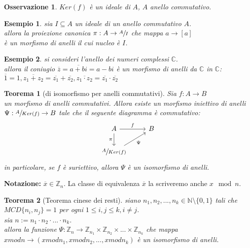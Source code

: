 \documentclass[a4paper,12pt]{article}
\theoremstyle{def}
\theoremstyle{prop}
\theoremstyle{esempio}
\newtheorem*{example}{Esempio}
\theoremstyle{dimostrazione}
\theoremstyle{teo}
\newtheorem*{teorema}{Teorema}
\theoremstyle{osservazione}
\newtheorem*{osservazione}{Osservazione}
\begin{document}
\begin{osservazione}
	\(Ker(f)\) è un ideale di \(A\), \(A\) anello commutativo.
\end{osservazione}

\begin{example}
	sia \(I \subseteq A\) un ideale di un anello commutativo \(A\).\\
	allora la proiezione canonica \(\pi : A \rightarrow \sfrac{A}{I}\) che mappa \(a \rightarrow [a]\)\\
	è un morfismo di anelli il cui nucleo è \(I\).
\end{example}

\begin{example}
	si consideri l'anello dei numeri complessi \(\mathbb{C}\).\\
	allora il coniugio \(\overline{z} = \overline{a+bi} = a - bi\) è un morfismo di anelli da \(\mathbb{C}\) in \(\mathbb{C}\):\\
	\(\overline{1} = 1, \overline{z_1 + z_2} = \overline{z_1} + \overline{z_2}, \overline{z_1 \cdot z_2} = \overline{z_1} \cdot \overline{z_2}\)
\end{example}

\begin{teorema}[di isomorfismo per anelli commutativi]
	Sia \(f : A \rightarrow B\)\\
	un morfismo di anelli commutativi. Allora esiste un morfismo iniettivo di anelli\\
	\(\Psi : \sfrac{A}{Ker(f)} \rightarrow B\) tale che il seguente diagramma è commutativo:
	\[
		\begin{tikzcd}
			A \arrow{r}{f} \arrow[swap]{d}{\pi} & B \\
			\sfrac{A}{Ker(f)} \arrow[swap]{ur}{\Psi}
		\end{tikzcd}
	\]
	in particolare, se \(f\) è suriettivo, allora \(\Psi\) è un isomorfismo di anelli.
\end{teorema}

\newpage

\textbf{Notazione:} \(\overline{x} \in \mathbb{Z}_n\). La classe di equivalenza \(\overline{x}\) la scriveremo anche  \(x \mod n\).

\begin{teorema} [Teorema cinese dei resti]
	siano \(n_1,n_2,...,n_k \in \mathbb{N} \setminus \{0,1\}\) tali che\\
	\(MCD \{n_i,n_j\} = 1\) per ogni \(1 \leq i,j \leq k, i \neq j\).\\
	sia \(n := n_1 \cdot n_2 \cdot ... \cdot n_k\).\\
	allora la funzione \(\Psi : \mathbb{Z}_n \rightarrow \mathbb{Z}_{n_1} \times \mathbb{Z}_{n_2} \times ... \times \mathbb{Z}_{n_k}\) che mappa\\
	\(x mod n \rightarrow (x mod n_1, x mod n_2, ..., x mod n_k)\) è un isomorfismo di anelli.\\
\end{teorema}
\end{document}
